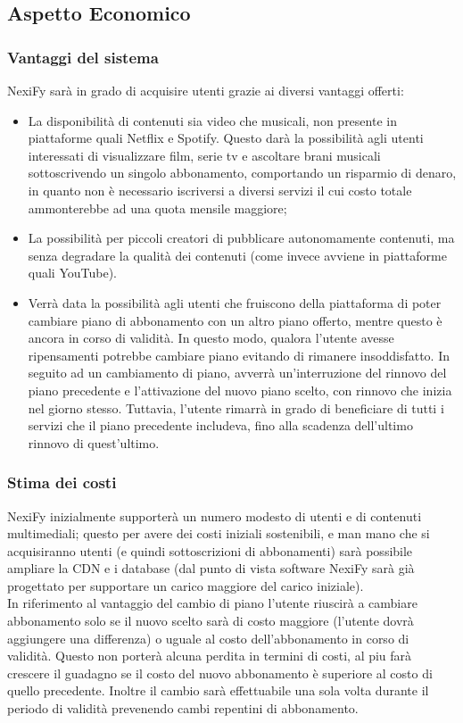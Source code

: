 \subsection{Aspetto Economico}
\subsubsection{Vantaggi del sistema}

NexiFy sarà in grado di acquisire utenti grazie ai diversi vantaggi offerti:
    \begin{itemize}
       	\item La disponibilità di contenuti sia video che musicali, non presente in piattaforme quali Netflix e Spotify. Questo darà la possibilità agli utenti interessati di visualizzare film, serie tv e ascoltare brani musicali sottoscrivendo un singolo abbonamento, comportando un risparmio di denaro, in quanto non è necessario iscriversi a diversi servizi il cui costo totale ammonterebbe ad una quota mensile maggiore;
        	\item La possibilità per piccoli creatori di pubblicare autonomamente contenuti, ma senza degradare la qualità dei contenuti (come invece avviene in piattaforme quali YouTube).
	\item\label{VantaggioSistema_cambioPiano} Verrà data la possibilità agli utenti che fruiscono della
	piattaforma di poter cambiare piano di abbonamento con un altro piano
	offerto, mentre questo è ancora in corso di validità.
	In questo modo, qualora l'utente avesse ripensamenti potrebbe cambiare piano evitando di rimanere insoddisfatto.
	In seguito ad un cambiamento di piano, avverrà un'interruzione del rinnovo del piano
	precedente e l'attivazione del nuovo piano scelto, con rinnovo che inizia nel giorno stesso. Tuttavia,
	l'utente rimarrà in grado di beneficiare di tutti i servizi che il piano precedente includeva, fino alla scadenza
	dell'ultimo rinnovo di quest'ultimo.
	\end{itemize}
\subsubsection{Stima dei costi}

NexiFy inizialmente supporterà un numero modesto di utenti e di contenuti multimediali; questo per avere dei costi iniziali sostenibili, e man mano che si acquisiranno utenti (e quindi sottoscrizioni di abbonamenti) sarà possibile ampliare la CDN e i database (dal punto di vista software NexiFy sarà già progettato per supportare un carico maggiore del carico iniziale).\\
In riferimento al vantaggio del cambio di piano l'utente riuscirà a cambiare abbonamento solo se il nuovo scelto sarà di costo maggiore (l'utente dovrà aggiungere una differenza) o uguale al costo dell'abbonamento in corso di validità. Questo non porterà alcuna perdita in termini di costi, al piu farà crescere il guadagno se il costo del nuovo abbonamento è superiore al costo di quello precedente. Inoltre il cambio sarà effettuabile una sola volta durante il periodo di validità prevenendo cambi repentini di abbonamento.

